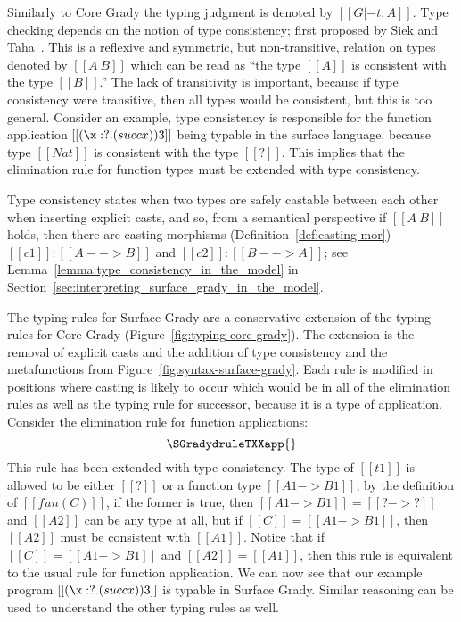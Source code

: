 Similarly to Core Grady the typing judgment is denoted by
$[[G |- t : A]]$.  Type checking depends on the notion of type consistency;
first proposed by Siek and Taha~\cite{Siek:2006}.  This is a reflexive
and symmetric, but non-transitive, relation on types denoted by
$[[A ~ B]]$ which can be read as ``the type $[[A]]$ is consistent with
the type $[[B]]$.''  The lack of transitivity is important, because
if type consistency were transitive, then all types would be
consistent, but this is too general. Consider an example, type
consistency is responsible for the function application $[[(\x:?.(succ
    x)) 3]]$ being typable in the surface language, because type
$[[Nat]]$ is consistent with the type $[[?]]$.  This implies that the
elimination rule for function types must be extended with type
consistency.

Type consistency states when two types are safely castable between
each other when inserting explicit casts, and so, from a semantical
perspective if $[[A ~ B]]$ holds, then there are casting
morphisms (Definition~\ref{def:casting-mor}) $[[c1]] : [[A --> B]]$
and $[[c2]] : [[B --> A]]$; see
Lemma~\ref{lemma:type_consistency_in_the_model} in
Section~\ref{sec:interpreting_surface_grady_in_the_model}.

The typing rules for Surface Grady are a conservative extension of the
typing rules for Core Grady (Figure~\ref{fig:typing-core-grady}). The
extension is the removal of explicit casts and the addition of type
consistency and the metafunctions from
Figure~\ref{fig:syntax-surface-grady}.  Each rule is modified in
positions where casting is likely to occur which would be in all of
the elimination rules as well as the typing rule for successor,
because it is a type of application.  Consider the elimination rule
for function applications:
\[
\SGradydruleTXXapp{}
\]
This rule has been extended with type consistency.  The type of
$[[t1]]$ is allowed to be either $[[?]]$ or a function type $[[A1 ->
    B1]]$, by the definition of $[[fun(C)]]$, if the former is true,
then $[[A1 -> B1]] = [[? -> ?]]$ and $[[A2]]$ can be any type at all,
but if $[[C]] = [[A1 -> B1]]$, then $[[A2]]$ must be consistent with
$[[A1]]$.  Notice that if $[[C]] = [[A1 -> B1]]$ and $[[A2]] =
[[A1]]$, then this rule is equivalent to the usual rule for function
application. We can now see that our example program $[[(\x:?.(succ
    x)) 3]]$ is typable in Surface Grady.  Similar reasoning can be
used to understand the other typing rules as well.

